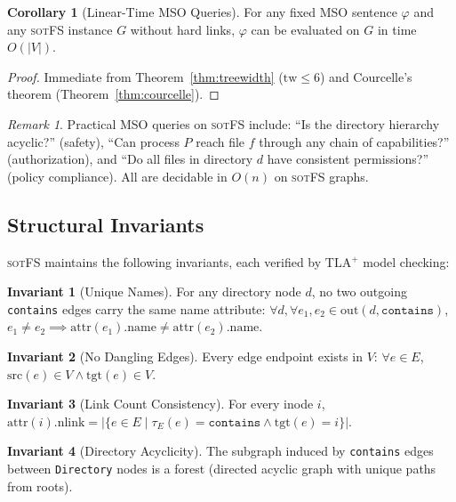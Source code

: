 \documentclass[11pt,a4paper]{article}
\theoremstyle{definition}
\newtheorem{corollary}[theorem]{Corollary}
\newtheorem{invariant}{Invariant}[section]
\theoremstyle{remark}
\newtheorem{remark}{Remark}[section]
\newcommand{\sotfs}{\textsc{sotFS}}
\newcommand{\tw}{\ensuremath{\mathrm{tw}}}
\begin{document}
\begin{corollary}[Linear-Time MSO Queries]
\label{cor:mso}
For any fixed MSO sentence $\varphi$ and any \sotfs{} instance $G$
without hard links, $\varphi$ can be evaluated on $G$ in time $O(|V|)$.
\end{corollary}

\begin{proof}
Immediate from Theorem~\ref{thm:treewidth} ($\tw \leq 6$) and
Courcelle's theorem (Theorem~\ref{thm:courcelle}).
\end{proof}

\begin{remark}
Practical MSO queries on \sotfs{} include: ``Is the directory
hierarchy acyclic?'' (safety), ``Can process $P$ reach file $f$
through any chain of capabilities?'' (authorization), and ``Do all
files in directory $d$ have consistent permissions?'' (policy
compliance). All are decidable in $O(n)$ on \sotfs{} graphs.
\end{remark}

\subsection{Structural Invariants}
\label{sec:sotfs-invariants}

\sotfs{} maintains the following invariants, each verified by TLA$^+$
model checking:

\begin{invariant}[Unique Names]
\label{inv:unique-names}
For any directory node $d$, no two outgoing \texttt{contains} edges
carry the same name attribute: $\forall d, \forall e_1, e_2 \in
\mathrm{out}(d, \texttt{contains})$, $e_1 \neq e_2 \implies
\mathrm{attr}(e_1).\mathrm{name} \neq \mathrm{attr}(e_2).\mathrm{name}$.
\end{invariant}

\begin{invariant}[No Dangling Edges]
\label{inv:no-dangling}
Every edge endpoint exists in $V$: $\forall e \in E$,
$\mathrm{src}(e) \in V \land \mathrm{tgt}(e) \in V$.
\end{invariant}

\begin{invariant}[Link Count Consistency]
\label{inv:link-count}
For every inode $i$, $\mathrm{attr}(i).\mathrm{nlink} =
|\{e \in E \mid \tau_E(e) = \texttt{contains} \land
\mathrm{tgt}(e) = i\}|$.
\end{invariant}

\begin{invariant}[Directory Acyclicity]
\label{inv:acyclicity}
The subgraph induced by \texttt{contains} edges between
\texttt{Directory} nodes is a forest (directed acyclic graph with
unique paths from roots).
\end{invariant}
\end{document}
